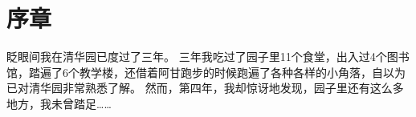 \chapter{序章}

眨眼间我在清华园已度过了三年。
三年我吃过了园子里11个食堂，出入过4个图书馆，踏遍了6个教学楼，还借着阿甘跑步的时候跑遍了各种各样的小角落，自以为已对清华园非常熟悉了解。
然而，第四年，我却惊讶地发现，园子里还有这么多地方，我未曾踏足……

% 
